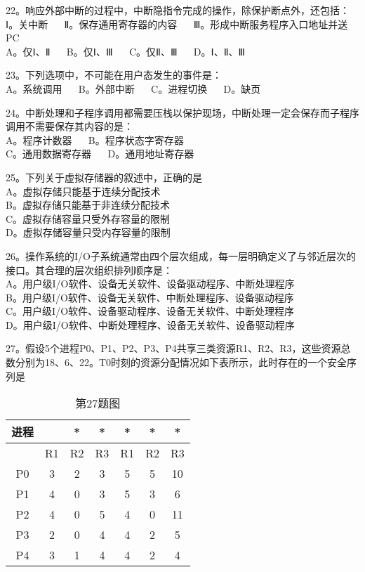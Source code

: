 22。响应外部中断的过程中，中断隐指令完成的操作，除保护断点外，还包括：\\
Ⅰ。关中断 $\quad$ Ⅱ。保存通用寄存器的内容 $\quad$ Ⅲ。形成中断服务程序入口地址并送PC\\
A。仅Ⅰ、Ⅱ $\quad$ B。仅Ⅰ、Ⅲ $\quad$ C。仅Ⅱ、Ⅲ $\quad$ D。Ⅰ、Ⅱ、Ⅲ

23。下列选项中，不可能在用户态发生的事件是：\\
A。系统调用 $\quad$ B。外部中断 $\quad$ C。进程切换 $\quad$ D。缺页

24。中断处理和子程序调用都需要压栈以保护现场，中断处理一定会保存而子程序调用不需要保存其内容的是：\\
A。程序计数器 $\quad$ B。程序状态字寄存器\\
C。通用数据寄存器 $\quad$ D。通用地址寄存器

25。下列关于虚拟存储器的叙述中，正确的是\\
A。虚拟存储只能基于连续分配技术\\
B。虚拟存储只能基于非连续分配技术\\
C。虚拟存储容量只受外存容量的限制\\
D。虚拟存储容量只受内存容量的限制

26。操作系统的I/O子系统通常由四个层次组成，每一层明确定义了与邻近层次的接口。其合理的层次组织排列顺序是：\\
A。用户级I/O软件、设备无关软件、设备驱动程序、中断处理程序\\
B。用户级I/O软件、设备无关软件、中断处理程序、设备驱动程序\\
C。用户级I/O软件、设备驱动程序、设备无关软件、中断处理程序\\
D。用户级I/O软件、中断处理程序、设备无关软件、设备驱动程序

27。假设5个进程P0、P1、P2、P3、P4共享三类资源R1、R2、R3，这些资源总数分别为18、6、22。T0时刻的资源分配情况如下表所示，此时存在的一个安全序列是\\
\begin{table}[ht]
\centering
\caption{第27题图}\label{CSN12_tab1}
\begin{tabular}{|c|c|c|c|c|c|c|}
\hline
 进程 & & * & * & * & * & * \\
\hline
 & R1 & R2 & R3 & R1 & R2 & R3 \\
\hline
P0 & 3 & 2 & 3 & 5 & 5 & 10 \\
\hline
P1 & 4 & 0 & 3 & 5 & 3 & 6 \\
\hline
P2 & 4 & 0 & 5 & 4 & 0 & 11 \\
\hline
P3 & 2 & 0 & 4 & 4 & 2 & 5 \\
\hline
P4 & 3 & 1 & 4 & 4 & 2 & 4 \\
\hline
\end{tabular}
\end{table} \\

